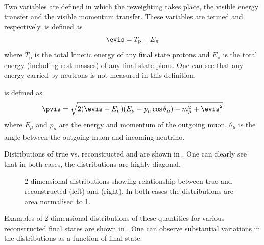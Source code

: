 Two variables are defined in which the reweighting takes place, the visible energy transfer and the visible momentum transfer. 
These variables are termed \evis and \pvis respectively.
\evis is defined as 
\begin{equation}
	\evis = T_{\textrm{p}} + E_{\pi}
\end{equation}
where $T_{\textrm{p}}$ is the total kinetic energy of any final state protons and $E_{\pi}$ is the total energy (including rest masses) of any final state pions.
One can see that any energy carried by neutrons is not measured in this definition.

\pvis is defined as
\begin{equation}
	\pvis = \sqrt{ 2(\evis + E_{\mu})(E_{\mu} - p_{\mu}\cos\theta_{\mu}) - m_{\mu}^{2} + \evis^{2} }
\end{equation}
where $E_{\mu}$ and $p_{\mu}$ are the energy and momentum of the outgoing muon.
$\theta_{\mu}$ is the angle between the outgoing muon and incoming neutrino.

Distributions of true vs. reconstructed \evis and \pvis are shown in .
One can clearly see that in both cases, the distributions are highly diagonal.

\begin{figure}[h]
	\begin{minipage}[t]{.5\linewidth}
		\begin{adjustbox}{max totalsize=\linewidth, center}
			
		\end{adjustbox}	
	\end{minipage}
	\hfill
	\begin{minipage}[t]{.5\linewidth}
		\begin{adjustbox}{max totalsize=\linewidth, center}
			
		\end{adjustbox}
	\end{minipage}
	\caption[True vs. reconstructed \evis (left) and \pvis (right)]{2-dimensional distributions showing relationship between true and reconstructed \evis (left) and \pvis (right). In both cases the distributions are area normalised to 1.}
	\label{fig:visibleTrueReco}
\end{figure}

Examples of 2-dimensional distributions of these quantities for various reconstructed final states are shown in .
One can observe substantial variations in the distributions as a function of final state.

